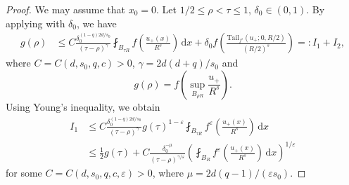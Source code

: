 \documentclass[11pt]{amsart}
\theoremstyle{plain}
\theoremstyle{definition}
\numberwithin{equation}{section}
\newcommand{\dx} {\,\mathrm{d}x}
\begin{document}
\begin{proof}
We may assume that $x_0 = 0$. Let $1/2 \leq \rho < \tau \leq 1$, $\delta_0 \in (0,1)$. By applying  with $\delta_0$, we have
\begin{equation} \label{eq:locbdd-e-I12}
\begin{split}
g(\rho)
&\leq C \frac{\delta_0^{(1-q)2d/s_0}}{(\tau-\rho)^{\gamma}} \fint_{B_{\tau R}} f\left( \frac{u_+(x)}{R^s} \right) \dx + \delta_0 f \left( \frac{\mathrm{Tail}_{f'}(u_+;0,R/2)}{(R/2)^s} \right) =: I_1 + I_2,
\end{split}
\end{equation}
where $C = C(d, s_0, q, c) > 0$, $\gamma = 2d(d+q)/s_0$ and
\begin{equation*}
g(\rho) = f\left( \sup_{B_{\rho R}} \frac{u_+}{R^s} \right).
\end{equation*}
Using Young's inequality, we obtain
\begin{equation} \label{eq:locbdd-e-I1}
\begin{split}
I_1
&\leq C \frac{\delta_0^{(1-q)2d/s_0}}{(\tau-\rho)^{\gamma}} g(\tau)^{1-\varepsilon} \fint_{B_{\tau R}} f^{\varepsilon} \left( \frac{u_+(x)}{R^s} \right) \dx \\
&\leq \frac{1}{2} g(\tau) + C \frac{\delta_0^{-\mu}}{(\tau-\rho)^{\gamma/\varepsilon}} \left( \fint_{B_{R}} f^{\varepsilon} \left( \frac{u_+(x)}{R^s} \right) \dx \right)^{1/\varepsilon}
\end{split}
\end{equation}
for some $C = C(d, s_0, q, c, \varepsilon) > 0$, where $\mu = 2d(q-1)/(\varepsilon s_0)$.

\end{proof}
\end{document}
